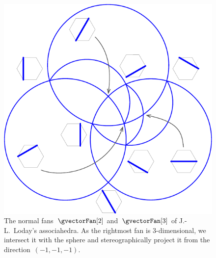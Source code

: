 \documentclass{amsart}
\theoremstyle{definition}
\begin{document}
\begin{figure}[h]
	\capstart
	\centerline{\hspace{1.5cm}\includegraphics[scale=.45]{lodayFan3}}
	\caption{The normal fans~$\gvectorFan[2]$ and~$\gvectorFan[3]$ of J.-L.~Loday's associahedra. As the rightmost fan is $3$-dimensional, we intersect it with the sphere and stereographically project it from the direction~$(-1,-1,-1)$.}
	\label{fig:lodayFans}
\end{figure}
\end{document}
